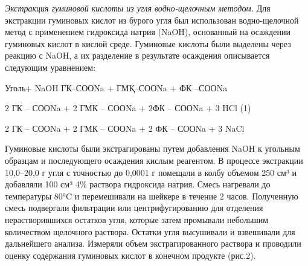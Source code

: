 \emph{Экстракция гуминовой кислоты из угля водно-щелочным методом.} Для
экстракции гуминовых кислот из бурого угля был использован
водно-щелочной метод с применением гидроксида натрия (NaOH), основанный
на осаждении гуминовых кислот в кислой среде. Гуминовые кислоты были
выделены через реакцию с NaOH, а их разделение в результате осаждения
описывается следующим уравнением:

Уголь+ NaOH ГК--СООNa + ГМҚ--СООNa + ФК --СООNa

2 ГК -- СООNa + 2 ГМК -- СООNa + 2ФК -- СООNa + 3 HCl (1)

2 ГК -- СООNa + 2 ГМК -- СООNa + 2 ФК -- СООNa + 3 NaCl

Гуминовые кислоты были экстрагированы путем добавления NaOH к угольным
образцам и последующего осаждения кислым реагентом. В процессе
экстракции 10,0--20,0 г угля с точностью до 0,0001 г помещали в колбу
объемом 250 см³ и добавляли 100 см³ 4\% раствора гидроксида натрия.
Смесь нагревали до температуры 80°C и перемешивали на шейкере в течение
2 часов. Полученную смесь подвергали фильтрации или центрифугированию
для отделения нерастворившихся остатков угля, которые затем промывали
небольшим количеством щелочного раствора. Остатки угля высушивали и
взвешивали для дальнейшего анализа. Измеряли объем экстрагированного
раствора и проводили оценку содержания гуминовых кислот в конечном
продукте (рис.2).

% 
% 
% 
% 
% 
% 

